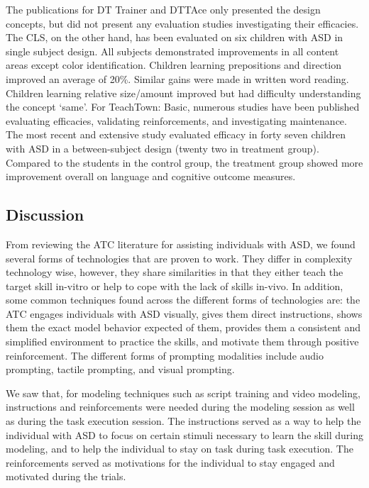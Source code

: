 \documentclass{ut-thesis}
\begin{document}
The publications for DT Trainer and DTTAce only presented the design concepts, but did not present any evaluation studies investigating their efficacies.  The CLS, on the other hand, has been evaluated on six children with ASD in single subject design.  All subjects demonstrated improvements in all content areas except color identification. Children learning prepositions and direction improved an average of 20\%.  Similar gains were made in written word reading. Children learning relative size/amount improved but had difficulty understanding the concept ‘same’.  For TeachTown: Basic, numerous studies have been published evaluating efficacies, validating reinforcements, and investigating maintenance.  The most recent and extensive study evaluated efficacy in forty seven children with ASD in a between-subject design (twenty two in treatment group).  Compared to the students in the control group, the treatment group showed more improvement overall on language and cognitive outcome measures.


\subsection{Discussion}
\label{Sec:AT4ASDDiscussion}
From reviewing the ATC literature for assisting individuals with ASD, we found several forms of technologies that are proven to work.  They differ in complexity technology wise, however, they share similarities in that they either teach the target skill in-vitro or help to cope with the lack of skills in-vivo.  In addition, some common techniques found across the different forms of technologies are: the ATC engages individuals with ASD visually, gives them direct instructions, shows them the exact model behavior expected of them, provides them a consistent and simplified environment to practice the skills, and motivate them through positive reinforcement.  The different forms of prompting modalities include audio prompting, tactile prompting, and visual prompting.

We saw that, for modeling techniques such as script training and video modeling, instructions and reinforcements were needed during the modeling session as well as during the task execution session.  The instructions served as a way to help the individual with ASD to focus on certain stimuli necessary to learn the skill during modeling, and to help the individual to stay on task during task execution.  The reinforcements served as motivations for the individual to stay engaged and motivated during the trials.
\end{document}
